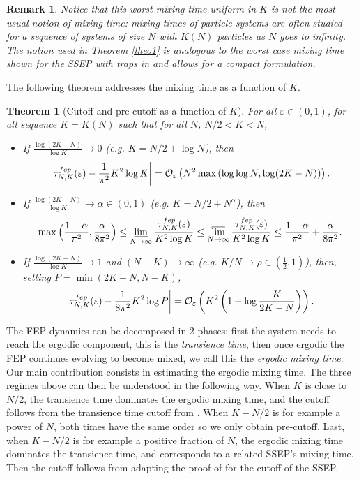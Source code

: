 \documentclass[11pt,a4paper]{article}
\newcommand{\FEP}{\textsc{fep}}
\newtheorem{theorem}{Theorem}[section]
\newtheorem{remark}{Remark}[section]
\newcommand{\eqs}[1]{\begin{equation}#1\end{equation}}
\begin{document}
\begin{remark}
Notice that this worst mixing time uniform in $K$ is not the most usual notion of mixing time: mixing times of particle systems are often studied for a sequence of systems of size $N$ with $K(N)$ particles as $N$ goes to infinity. 
The notion used in Theorem \ref{theo1} is analogous to the worst case mixing time shown for the SSEP with traps in \cite[Theorem 1.3]{erignoux_cutoff_2024} and allows for a compact formulation. 
\end{remark} 

The following theorem addresses the mixing time as a function of $K$.
\begin{theorem}[Cutoff and pre-cutoff as a function of $K$] \label{th:diff_reg}
For all $\varepsilon \in (0,1)$, for all sequence $K=K(N)$ such that for all $N$, $N/2 < K < N$, 
\begin{itemize}
\item If $\frac{\log (2K-N)}{\log K} \longrightarrow 0$ (e.g. $K = N/2 + \log N$), then 
\eqs{\left|\tau^{\FEP}_{N,K}(\varepsilon)-\frac{1}{\pi^2}K^2 \log K\right| =\mathcal{O}_\varepsilon\left( N^2 \max\left(\log\log N,  \log (2K-N)\right)\right).}
\item If $\frac{\log (2K-N)}{\log K} \longrightarrow \alpha \in (0,1)$ (e.g. $K = N/2 + N^\alpha$), then
\eqs{\max\Big(\frac{1-\alpha}{\pi^2},\frac{\alpha}{8\pi^2}\Big) \le \varliminf\limits_{N \to \infty} \frac{\tau^{\FEP}_{N,K}(\varepsilon)}{K^2 \log K} \le \varlimsup\limits_{N \to \infty} \frac{\tau^{\FEP}_{N,K}(\varepsilon)}{K^2 \log K} \le \frac{1-\alpha}{\pi^2} + \frac{\alpha}{8 \pi^2}.}
\item If $\frac{\log (2K-N)}{\log K} \longrightarrow 1$ and $(N-K)\to \infty$  (e.g. $K/N \longrightarrow \rho \in (\frac12,1)$), then, setting $P=\min(2K-N,N-K)$,
\eqs{\left|\tau^{\FEP}_{N,K}(\varepsilon)- \frac{1}{8\pi^2}K^2 \log P\right| =\mathcal{O}_\varepsilon \left(K^2\left(1+\log\frac{K}{2K-N}\right)\right).}
\end{itemize}
\end{theorem}

The FEP dynamics can be decomposed in 2 phases: first the system needs to reach the ergodic component, this is the \emph{transience time}, then once ergodic the FEP continues evolving to become mixed, we call this the \emph{ergodic mixing time}. Our main contribution consists in estimating the ergodic mixing time. The three regimes above can then be understood in the following way. When $K$ is close to $N/2$, the transience time dominates the ergodic mixing time, and the cutoff follows from the transience time cutoff from \cite{erignoux_cutoff_2024}. When $K-N/2$ is for example a power of $N$, both times have the same order so we only obtain pre-cutoff. Last, when $K-N/2$ is for example a positive fraction of $N$, the ergodic mixing time dominates the transience time, and corresponds to a related SSEP's mixing time. Then the cutoff follows from adapting the proof of \cite{lacoin_simple_2017} for the cutoff of the SSEP.
\end{document}
